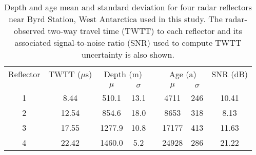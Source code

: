  \begin{table}
 \centering
 \caption{  Depth and age mean and standard deviation for four radar reflectors near Byrd Station, West Antarctica used in this study. The radar-observed two-way travel time (TWTT) to each reflector and its associated signal-to-noise ratio (SNR) used to compute TWTT uncertainty is also shown.}
 \begin{tabular}{ c c c c c c c c}
Reflector & TWTT ($\mu$s)&  \multicolumn{2}{c}{Depth (m)} &  & \multicolumn{2}{c}{Age  (a)} & SNR  (dB) \\   
 \cline{3-4} \cline{6-7}
 & & $\mu$  & $\sigma$ & & $\mu$  & $\sigma$ &\\
  \cline{1-8}
  1 & 8.44    & 510.1  &  13.1 & & 4711 & 246  & 10.41\\
  2 & 12.54   & 854.6 &  18.0 & & 8653 & 318  & 8.13 \\
  3 & 17.55   & 1277.9 &  10.8 & & 17177 & 413  & 11.63\\
  4 & 22.42   & 1460.0 &  5.2 & & 24928 & 286 & 21.22 \\
 \end{tabular}

 \label{tab:depthunc}
\end{table}


